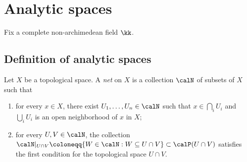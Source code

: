 \section{Analytic spaces}

    Fix a complete non-archimedean field \(\kk\).

\subsection{Definition of analytic spaces}


    \begin{definition}\label{def:net_and_quasi_net_to_define_analytic_space}
        Let \(X\) be a topological space. 
        A \emph{net} on \(X\) is a collection \(\calN\) of subsets of \(X\) such that
        \begin{enumerate}
            \item for every \(x \in X\), there exist \(U_1, \ldots, U_n \in \calN\) such that \(x \in \bigcap_i U_i\) and \(\bigcup_i U_i\) is an open neighborhood of \(x\) in \(X\);
            \item for every \(U, V \in \calN\), the collection \(\calN|_{U \cap V} \coloneqq \{W \in \calN : W \subseteq U \cap V\} \subset \calP(U \cap V)\) satisfies the first condition for the topological space \(U \cap V\).
        \end{enumerate}
    \end{definition}




